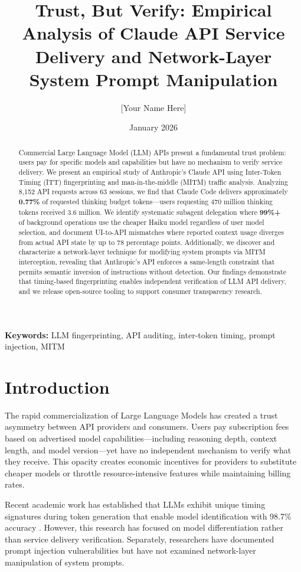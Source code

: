 \documentclass[11pt,a4paper]{article}
\title{Trust, But Verify: Empirical Analysis of Claude API Service Delivery and Network-Layer System Prompt Manipulation}
\author[1]{[Your Name Here]}
\affil[1]{Independent Security Researcher}
\date{January 2026}
\begin{document}
\maketitle

\begin{abstract}
Commercial Large Language Model (LLM) APIs present a fundamental trust problem: users pay for specific models and capabilities but have no mechanism to verify service delivery. We present an empirical study of Anthropic's Claude API using Inter-Token Timing (ITT) fingerprinting and man-in-the-middle (MITM) traffic analysis. Analyzing 8,152 API requests across 63 sessions, we find that Claude Code delivers approximately \textbf{0.77\%} of requested thinking budget tokens---users requesting 470 million thinking tokens received 3.6 million. We identify systematic subagent delegation where \textbf{99\%+} of background operations use the cheaper Haiku model regardless of user model selection, and document UI-to-API mismatches where reported context usage diverges from actual API state by up to 78 percentage points. Additionally, we discover and characterize a network-layer technique for modifying system prompts via MITM interception, revealing that Anthropic's API enforces a same-length constraint that permits semantic inversion of instructions without detection. Our findings demonstrate that timing-based fingerprinting enables independent verification of LLM API delivery, and we release open-source tooling to support consumer transparency research.
\end{abstract}

\noindent\textbf{Keywords:} LLM fingerprinting, API auditing, inter-token timing, prompt injection, MITM

\section{Introduction}

The rapid commercialization of Large Language Models has created a trust asymmetry between API providers and consumers. Users pay subscription fees based on advertised model capabilities---including reasoning depth, context length, and model version---yet have no independent mechanism to verify what they receive. This opacity creates economic incentives for providers to substitute cheaper models or throttle resource-intensive features while maintaining billing rates.

Recent academic work has established that LLMs exhibit unique timing signatures during token generation that enable model identification with 98.7\% accuracy \cite{llms-rhythm}. However, this research has focused on model differentiation rather than service delivery verification. Separately, researchers have documented prompt injection vulnerabilities \cite{greshake2023} but have not examined network-layer manipulation of system prompts.
\end{document}

